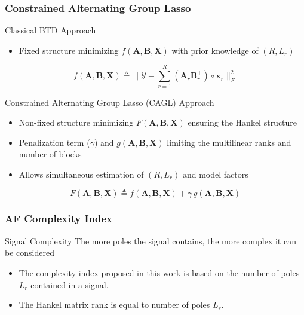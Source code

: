 \documentclass{beamer}
\begin{document}
	\begin{frame}
		\frametitle{Constrained Alternating Group Lasso}
		
		\begin{block}{Classical BTD Approach}
			\begin{itemize}
				\item Fixed structure minimizing $f(\textbf{A}, \textbf{B}, \textbf{X})$ with prior knowledge of $(R,L_{r})$
			\end{itemize}
		\end{block}
		\begin{equation}
			f(\textbf{A}, \textbf{B}, \textbf{X}) \triangleq
			 \Big\| {\mathcal{Y}} - \textstyle \sum_{r = 1}^{R} \left( \textbf{A}_r \textbf{B}_r^{\top} \right) \circ \textbf{x}_r  \Big\|_F^2
		\end{equation}
		\begin{block}{Constrained Alternating Group Lasso (CAGL) Approach}
			\begin{itemize}
				\item Non-fixed structure minimizing $F(\textbf{A},\textbf{B},\textbf{X})$ ensuring the Hankel structure
				\item Penalization term ($\gamma$) and $g({\textbf{A}, \textbf{B}, \textbf{X}})$ limiting the multilinear ranks and number of blocks
				\item Allows simultaneous estimation of $(R,L_{r})$ and model factors
			\end{itemize}
		\end{block}
		\begin{equation}
				  F({\textbf{A}, \textbf{B}, \textbf{X}})
				 \triangleq  
				 f({\textbf{A}, \textbf{B}, \textbf{X}}) + \gamma \, g({\textbf{A}, \textbf{B}, \textbf{X}})
		\end{equation}
	\end{frame}
	
	\begin{frame}
		\frametitle{AF Complexity Index}
		
		\begin{block}{Signal Complexity}
			The more poles the signal contains, the more complex it can be considered
		\end{block}
		
		\begin{itemize}
			\item The complexity index proposed in this work is based on the number of poles $L_{r}$ contained in a signal. 
			\item The Hankel matrix rank is equal to number of poles $L_{r}$.
		\end{itemize}

	\end{frame}
	
\end{document}
